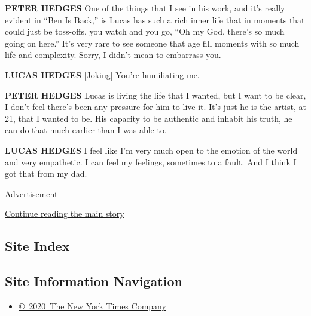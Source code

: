 \textbf{PETER HEDGES} One of the things that I see in his work, and it's
really evident in ``Ben Is Back,'' is Lucas has such a rich inner life
that in moments that could just be toss-offs, you watch and you go, ``Oh
my God, there's so much going on here.'' It's very rare to see someone
that age fill moments with so much life and complexity. Sorry, I didn't
mean to embarrass you.

\textbf{LUCAS HEDGES} {[}Joking{]} You're humiliating me.

\textbf{PETER HEDGES} Lucas is living the life that I wanted, but I want
to be clear, I don't feel there's been any pressure for him to live it.
It's just he is the artist, at 21, that I wanted to be. His capacity to
be authentic and inhabit his truth, he can do that much earlier than I
was able to.

\textbf{LUCAS HEDGES} I feel like I'm very much open to the emotion of
the world and very empathetic. I can feel my feelings, sometimes to a
fault. And I think I got that from my dad.

Advertisement

\protect\hyperlink{after-bottom}{Continue reading the main story}

\hypertarget{site-index}{%
\subsection{Site Index}\label{site-index}}

\hypertarget{site-information-navigation}{%
\subsection{Site Information
Navigation}\label{site-information-navigation}}

\begin{itemize}
\tightlist
\item
  \href{https://help.nytimes3xbfgragh.onion/hc/en-us/articles/115014792127-Copyright-notice}{©~2020~The
  New York Times Company}
\end{itemize}

